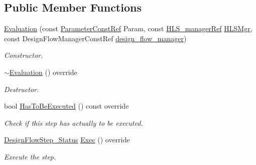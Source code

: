 \subsection*{Public Member Functions}
\begin{DoxyCompactItemize}
\item 
\hyperlink{classEvaluation_a0496e2964ae3d73fe1a255526a8f4ee1}{Evaluation} (const \hyperlink{Parameter_8hpp_a37841774a6fcb479b597fdf8955eb4ea}{Parameter\+Const\+Ref} Param, const \hyperlink{hls__manager_8hpp_acd3842b8589fe52c08fc0b2fcc813bfe}{H\+L\+S\+\_\+manager\+Ref} \hyperlink{classHLS__step_ade85003a99d34134418451ddc46a18e9}{H\+L\+S\+Mgr}, const Design\+Flow\+Manager\+Const\+Ref \hyperlink{classDesignFlowStep_ab770677ddf087613add30024e16a5554}{design\+\_\+flow\+\_\+manager})
\begin{DoxyCompactList}\small\item\em Constructor. \end{DoxyCompactList}\item 
\hyperlink{classEvaluation_adaca340ad09e89e3c6d363d07a9c181b}{$\sim$\+Evaluation} () override
\begin{DoxyCompactList}\small\item\em Destructor. \end{DoxyCompactList}\item 
bool \hyperlink{classEvaluation_a036dd1c9ae9fe7d5e255eb9300bf9e5f}{Has\+To\+Be\+Executed} () const override
\begin{DoxyCompactList}\small\item\em Check if this step has actually to be executed. \end{DoxyCompactList}\item 
\hyperlink{design__flow__step_8hpp_afb1f0d73069c26076b8d31dbc8ebecdf}{Design\+Flow\+Step\+\_\+\+Status} \hyperlink{classEvaluation_a74f7914b49ce8c21b264857eb5c2d81d}{Exec} () override
\begin{DoxyCompactList}\small\item\em Execute the step. \end{DoxyCompactList}\end{DoxyCompactItemize}
